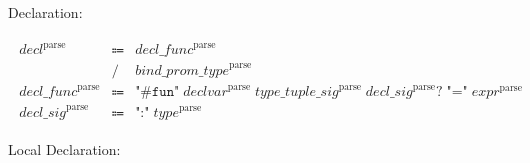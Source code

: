 Declaration:

\begin{align*}
    \begin{array}{rcll}
        \mathit{decl}^\mathrm{parse}
        &\Coloneq &\mathit{decl\_func}^\mathrm{parse} \\
        &\mathrel{/} &\mathit{bind\_prom\_type}^\mathrm{parse} \\
        \mathit{decl\_func}^\mathrm{parse}
        &\Coloneq &\texttt{"\#fun"}\; \mathit{declvar}^\mathrm{parse}\; \mathit{type\_tuple\_sig}^\mathrm{parse}\; \mathit{decl\_sig}^\mathrm{parse}{?}\; \texttt{"="}\; \mathit{expr}^\mathrm{parse} \\
        \mathit{decl\_sig}^\mathrm{parse}
        &\Coloneq &\texttt{":"}\; \mathit{type}^\mathrm{parse}
    \end{array}
\end{align*}

Local Declaration:

